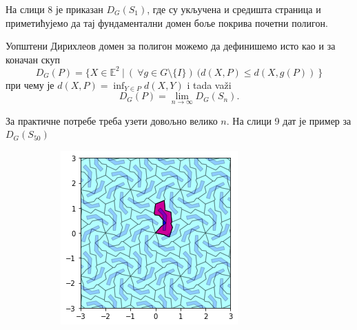 \documentclass[12pt]{report}
\begin{document}
На слици 8 је приказан $D_G(S_1)$, где су укључена и средишта страница и приметићујемо да тај фундаментални домен боље покрива почетни полигон. 


Уопштени Дирихлеов домен за полигон можемо да дефинишемо исто као и за коначан скуп
$$D_G(P) = \{X \in \mathbb{E}^2\:|\:(\:\forall g \in G \setminus \{I\})\:(d(X,P)\leq d(X,g(P))\:\}$$
при чему је $d(X,P) = \inf_{Y \in P} d(X,Y)$ i tada va\v zi
$$ D_G(P) = \lim _{n\to \infty} D_G(S_n). $$


За практичне потребе треба узети довољно велико $n$. На слици 9 дат је пример за $D_G(S_{50})$

  \begin{figure}[H]
  \begin{subfigure}[b]{0.3\textwidth}
    \includegraphics[width=\textwidth]{output_17_0.png}
    \label{fig:f7}
  \end{subfigure}
  \begin{subfigure}[b]{0.3\textwidth}

\end{subfigure}
\end{figure}
\end{document}
